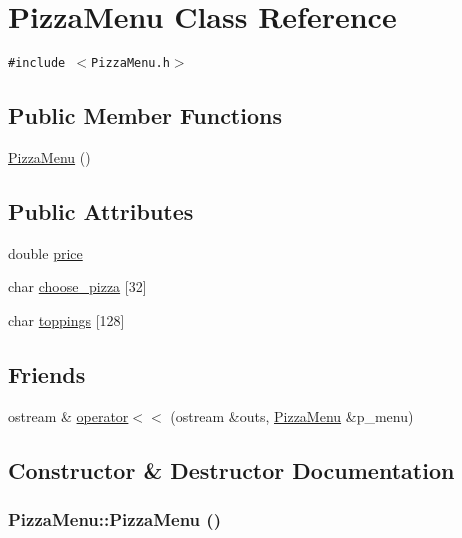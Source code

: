 \hypertarget{class_pizza_menu}{
\section{Pizza\-Menu Class Reference}
\label{class_pizza_menu}
}
{\tt \#include $<$Pizza\-Menu.h$>$}

\subsection*{Public Member Functions}
\begin{CompactItemize}
\item 
\hyperlink{class_pizza_menu_d5e4439012b1cdd2b59fb8568a17ba51}{Pizza\-Menu} ()
\end{CompactItemize}
\subsection*{Public Attributes}
\begin{CompactItemize}
\item 
double \hyperlink{class_pizza_menu_78a5eb43deef9a7b5b9ce157b9d52ac4}{price}
\item 
char \hyperlink{class_pizza_menu_04a00e7cbd548718d71a7c6afccae12f}{choose\_\-pizza} \mbox{[}32\mbox{]}
\item 
char \hyperlink{class_pizza_menu_b4f1e053cb69bc112e31a52a18d64dbd}{toppings} \mbox{[}128\mbox{]}
\end{CompactItemize}
\subsection*{Friends}
\begin{CompactItemize}
\item 
ostream \& \hyperlink{class_pizza_menu_09ec739bea659a73825966761529e5d7}{operator$<$$<$} (ostream \&outs, \hyperlink{class_pizza_menu}{Pizza\-Menu} \&p\_\-menu)
\end{CompactItemize}


\subsection{Constructor \& Destructor Documentation}
\hypertarget{class_pizza_menu_d5e4439012b1cdd2b59fb8568a17ba51}{
\subsubsection[PizzaMenu]{\setlength{\rightskip}{0pt plus 5cm}Pizza\-Menu::Pizza\-Menu ()}}
\label{class_pizza_menu_d5e4439012b1cdd2b59fb8568a17ba51}




